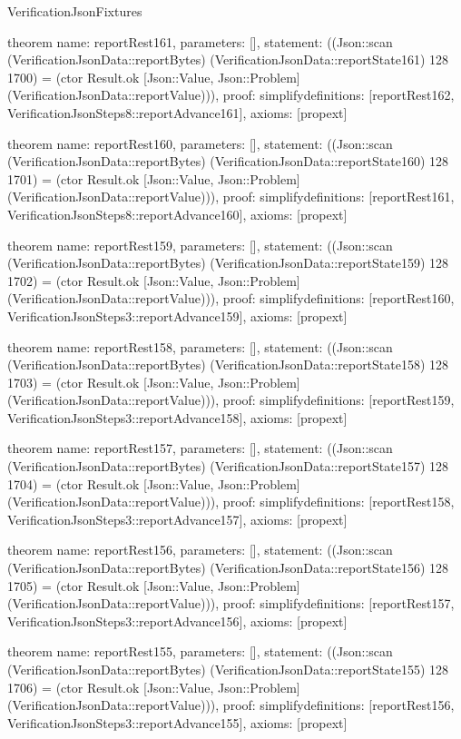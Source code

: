 \begin{lexlean}{VerificationJsonFixtures}
\begin{semanticmodule}
theorem{
  name: reportRest161,
  parameters: [],
  statement: ((Json::scan (VerificationJsonData::reportBytes) (VerificationJsonData::reportState161) 128 1700) = (ctor Result.ok [Json::Value, Json::Problem] (VerificationJsonData::reportValue))),
  proof: simplify{definitions: [reportRest162, VerificationJsonSteps8::reportAdvance161]},
  axioms: [propext]
}

theorem{
  name: reportRest160,
  parameters: [],
  statement: ((Json::scan (VerificationJsonData::reportBytes) (VerificationJsonData::reportState160) 128 1701) = (ctor Result.ok [Json::Value, Json::Problem] (VerificationJsonData::reportValue))),
  proof: simplify{definitions: [reportRest161, VerificationJsonSteps8::reportAdvance160]},
  axioms: [propext]
}

theorem{
  name: reportRest159,
  parameters: [],
  statement: ((Json::scan (VerificationJsonData::reportBytes) (VerificationJsonData::reportState159) 128 1702) = (ctor Result.ok [Json::Value, Json::Problem] (VerificationJsonData::reportValue))),
  proof: simplify{definitions: [reportRest160, VerificationJsonSteps3::reportAdvance159]},
  axioms: [propext]
}

theorem{
  name: reportRest158,
  parameters: [],
  statement: ((Json::scan (VerificationJsonData::reportBytes) (VerificationJsonData::reportState158) 128 1703) = (ctor Result.ok [Json::Value, Json::Problem] (VerificationJsonData::reportValue))),
  proof: simplify{definitions: [reportRest159, VerificationJsonSteps3::reportAdvance158]},
  axioms: [propext]
}

theorem{
  name: reportRest157,
  parameters: [],
  statement: ((Json::scan (VerificationJsonData::reportBytes) (VerificationJsonData::reportState157) 128 1704) = (ctor Result.ok [Json::Value, Json::Problem] (VerificationJsonData::reportValue))),
  proof: simplify{definitions: [reportRest158, VerificationJsonSteps3::reportAdvance157]},
  axioms: [propext]
}

theorem{
  name: reportRest156,
  parameters: [],
  statement: ((Json::scan (VerificationJsonData::reportBytes) (VerificationJsonData::reportState156) 128 1705) = (ctor Result.ok [Json::Value, Json::Problem] (VerificationJsonData::reportValue))),
  proof: simplify{definitions: [reportRest157, VerificationJsonSteps3::reportAdvance156]},
  axioms: [propext]
}

theorem{
  name: reportRest155,
  parameters: [],
  statement: ((Json::scan (VerificationJsonData::reportBytes) (VerificationJsonData::reportState155) 128 1706) = (ctor Result.ok [Json::Value, Json::Problem] (VerificationJsonData::reportValue))),
  proof: simplify{definitions: [reportRest156, VerificationJsonSteps3::reportAdvance155]},
  axioms: [propext]
}


\end{semanticmodule}
\end{lexlean}
